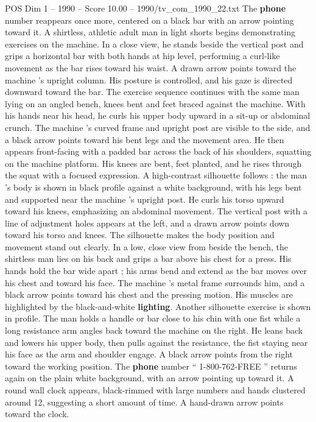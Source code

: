 \begin{textsample}{POS Dim 1 – 1990 – Score 10.00 – 1990/tv\_com\_1990\_22.txt}
The \textbf{phone} number reappears once more, centered on a black bar with an arrow pointing toward it.
A shirtless, athletic adult man in light shorts begins demonstrating exercises on the machine.
In a close view, he stands beside the vertical post and grips a horizontal bar with both hands at hip level, performing a curl-like movement as the bar rises toward his waist.
A drawn arrow points toward the machine ’s upright column.
His posture is controlled, and his gaze is directed downward toward the bar.
The exercise sequence continues with the same man lying on an angled bench, knees bent and feet braced against the machine.
With his hands near his head, he curls his upper body upward in a sit-up or abdominal crunch.
The machine ’s curved frame and upright post are visible to the side, and a black arrow points toward his bent legs and the movement area.
He then appears front-facing with a padded bar across the back of his shoulders, squatting on the machine platform.
His knees are bent, feet planted, and he rises through the squat with a focused expression.
A high-contrast silhouette follows : the man ’s body is shown in black profile against a white background, with his legs bent and supported near the machine ’s upright post.
He curls his torso upward toward his knees, emphasizing an abdominal movement.
The vertical post with a line of adjustment holes appears at the left, and a drawn arrow points down toward his torso and knees.
The silhouette makes the body position and movement stand out clearly.
In a low, close view from beside the bench, the shirtless man lies on his back and grips a bar above his chest for a press.
His hands hold the bar wide apart ; his arms bend and extend as the bar moves over his chest and toward his face.
The machine ’s metal frame surrounds him, and a black arrow points toward his chest and the pressing motion.
His muscles are highlighted by the black-and-white \textbf{lighting}.
Another silhouette exercise is shown in profile.
The man holds a handle or bar close to his chin with one fist while a long resistance arm angles back toward the machine on the right.
He leans back and lowers his upper body, then pulls against the resistance, the fist staying near his face as the arm and shoulder engage.
A black arrow points from the right toward the working position.
The \textbf{phone} number “ 1-800-762-FREE ” returns again on the plain white background, with an arrow pointing up toward it.
A round wall clock appears, black-rimmed with large numbers and hands clustered around 12, suggesting a short amount of time.
A hand-drawn arrow points toward the clock.

\end{textsample}
